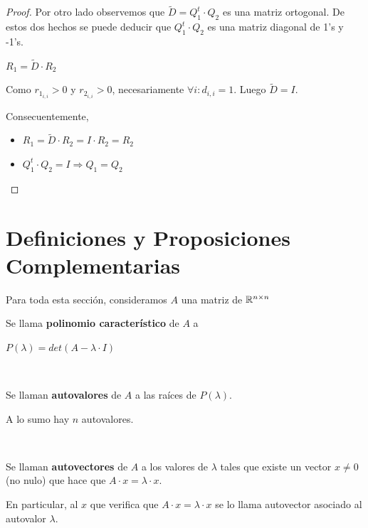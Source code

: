 \documentclass[]{article}
\begin{document}
\begin{prop}
\begin{proof}
		Por otro lado observemos que $\tilde D = Q_1^t\cdot Q_2$ es una matriz ortogonal. De estos dos hechos se puede deducir que $Q_1^t\cdot Q_2$ es una matriz diagonal de 1's y -1's.

		$R_1 = \tilde D \cdot R_2$

		Como $r_{1_{i,i}} > 0$ y $r_{2_{i,i}}>0$, necesariamente $\forall i : d_{i,i}=1$. Luego $\tilde D = I$.

		Consecuentemente,
		\begin{itemize}
			\item $R_1 = \tilde D \cdot R_2 = I \cdot R_2 = R_2$
			\item $Q_1^t\cdot Q_2 = I \Rightarrow Q_1 = Q_2$
		\end{itemize}

	\end{proof}
\end{prop}

\newpage

\section{Definiciones y Proposiciones Complementarias}
Para toda esta sección, consideramos $A$ una matriz de $\mathbb{R}^{n\times n}$

\begin{defi}
	Se llama \textbf{polinomio característico} de $A$ a
	\begin{center}
		$P(\lambda) = det(A-\lambda\cdot I)$
	\end{center}
\end{defi}
~\newline

\begin{defi}
	Se llaman \textbf{autovalores} de $A$ a las raíces de $P(\lambda)$.

	A lo sumo hay $n$ autovalores.
\end{defi}
~\newline

\begin{defi}
	Se llaman \textbf{autovectores} de $A$ a los valores de $\lambda$ tales que existe un vector $x\neq 0$ (no nulo) que hace que $A\cdot x = \lambda \cdot x$.

	En particular, al $x$ que verifica que $A\cdot x = \lambda \cdot x$ se lo llama autovector asociado al autovalor $\lambda$.
\end{defi}
~\newline
\end{document}
